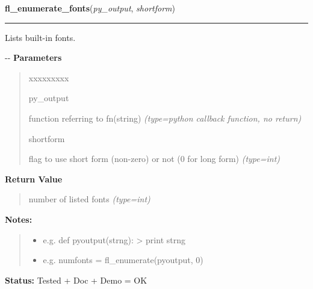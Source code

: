 \hspace{.8\funcindent}\begin{boxedminipage}{\funcwidth}

    \raggedright \textbf{fl\_enumerate\_fonts}(\textit{py\_output}, \textit{shortform})

    \vspace{-1.5ex}

    \rule{\textwidth}{0.5\fboxrule}
\setlength{\parskip}{2ex}

Lists built-in fonts.

-{}-
\setlength{\parskip}{1ex}
      \textbf{Parameters}
      \vspace{-1ex}

      \begin{quote}
        \begin{Ventry}{xxxxxxxxx}

          \item[py\_output]


function referring to fn(string)
            {\it (type=python callback function, no return)}

          \item[shortform]


flag to use short form (non-zero) or not (0 for long form)
            {\it (type=int)}

        \end{Ventry}

      \end{quote}

      \textbf{Return Value}
    \vspace{-1ex}

      \begin{quote}

number of listed fonts
      {\it (type=int)}

      \end{quote}

\textbf{Notes:}
\begin{quote}
  \begin{itemize}

  \item
    \setlength{\parskip}{0.6ex}

e.g. def pyoutput(strng): > print strng


  \item 
e.g. numfonts = fl\_enumerate(pyoutput, 0)


\end{itemize}

\end{quote}

\textbf{Status:} 
Tested + Doc + Demo = OK


    \end{boxedminipage}

